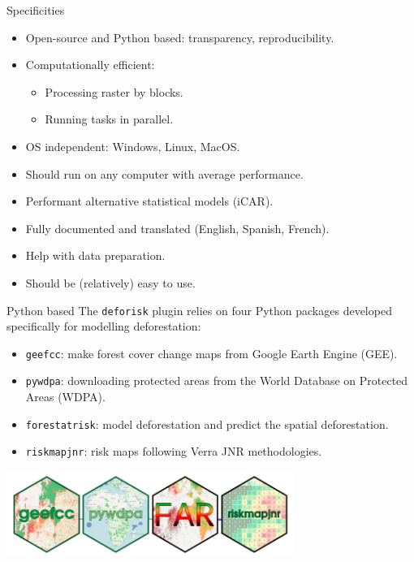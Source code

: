 \documentclass[10pt,table,dvipsnames,compress]{beamer}
\begin{document}
\begin{frame}[label={sec:orgf802a0a}]{Specificities}
\begin{itemize}
\item Open-source and Python based: transparency, reproducibility.
\item Computationally efficient:
\begin{itemize}
\item Processing raster by blocks.
\item Running tasks in parallel.
\end{itemize}
\item OS independent: Windows, Linux, MacOS.
\item Should run on any computer with average performance.
\item Performant alternative statistical models (iCAR).
\item Fully documented and translated (English, Spanish, French).
\item Help with data preparation.
\item Should be (relatively) easy to use.
\end{itemize}
\end{frame}

\begin{frame}[label={sec:orgc281ac2},fragile]{Python based}
 The \texttt{deforisk} plugin relies on four Python packages developed specifically for modelling deforestation:

\begin{itemize}
\item \texttt{geefcc}: make forest cover change maps from Google Earth Engine (GEE).
\item \texttt{pywdpa}: downloading protected areas from the World Database on Protected Areas (WDPA).
\item \texttt{forestatrisk}: model deforestation and predict the spatial deforestation.
\item \texttt{riskmapjnr}: risk maps following Verra JNR methodologies.
\end{itemize}

\begin{center}
\includegraphics[width=0.7\textwidth]{figs/logos-packages.png}
\end{center}
\end{frame}
\end{document}
